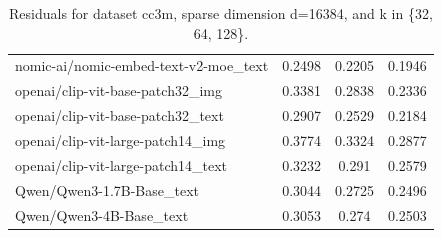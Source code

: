 \begin{table}[ht]
\begin{tabular}{lccc}
nomic-ai/nomic-embed-text-v2-moe\_text & 0.2498 & 0.2205 & 0.1946 \\
openai/clip-vit-base-patch32\_img & 0.3381 & 0.2838 & 0.2336 \\
openai/clip-vit-base-patch32\_text & 0.2907 & 0.2529 & 0.2184 \\
openai/clip-vit-large-patch14\_img & 0.3774 & 0.3324 & 0.2877 \\
openai/clip-vit-large-patch14\_text & 0.3232 & 0.291 & 0.2579 \\
Qwen/Qwen3-1.7B-Base\_text & 0.3044 & 0.2725 & 0.2496 \\
Qwen/Qwen3-4B-Base\_text & 0.3053 & 0.274 & 0.2503 \\
\hline
\end{tabular}
\caption{Residuals for dataset cc3m, sparse dimension d=16384, and k in \{32, 64, 128\}.}
\label{tab:residuals_cc3m_d_16384}
\end{table}
